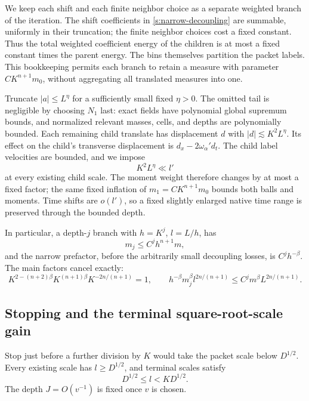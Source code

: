 We keep each shift and each finite neighbor choice as a separate
weighted branch of the iteration.  The shift coefficients in
\eqref{s:narrow-decoupling} are summable, uniformly in their truncation;
the finite neighbor choices cost a fixed constant.  Thus the total
weighted coefficient energy of the children is at most a fixed
constant times the parent energy.  The bins themselves partition the
packet labels.  This bookkeeping permits each branch to retain a
measure with parameter $C K^{n+1}m_0$, without aggregating all
translated measures into one.

Truncate $|a|\le L^\eta$ for a sufficiently small fixed $\eta>0$.
The omitted tail is negligible by choosing $N_1$ last: exact fields
have polynomial global supremum bounds, and normalized relevant
masses, cells, and depths are polynomially bounded.  Each remaining
child translate has displacement $d$ with $|d|\lesssim K^2L^\eta$.
Its effect on the child's transverse displacement is
$d_x-2\omega_\alpha'd_t$.  The child label velocities are bounded, and
we impose
\begin{equation}\label{s:shift-smallness}
 K^2L^\eta\ll l'
\end{equation}
at every existing child scale.  The moment weight therefore changes
by at most a fixed factor; the same fixed inflation of
$m_1=C K^{n+1}m_0$ bounds both balls and moments.  Time shifts are
$o(l')$, so a fixed slightly enlarged native time range is preserved
through the bounded depth.

In particular, a depth-$j$ branch with $h=K^j$, $l=L/h$, has
\begin{equation}\label{s:node-parameter}
 m_j\le C^j h^{n+1}m,
\end{equation}
and the narrow prefactor, before the arbitrarily small decoupling
losses, is $C^jh^{-\beta}$.  The main factors cancel exactly:
\begin{equation}\label{s:cancellation}
 K^{2-(n+2)\beta}K^{(n+1)\beta}K^{-2n/(n+1)}=1,
 \qquad
 h^{-\beta}m_j^\beta l^{2n/(n+1)}
       \le C^j m^\beta L^{2n/(n+1)}.
\end{equation}

\subsection{Stopping and the terminal square-root-scale gain}

Stop just before a further division by $K$ would take the packet scale
below $D^{1/2}$.  Every existing scale has $l\ge D^{1/2}$, and terminal
scales satisfy
\begin{equation}\label{s:terminal-scale}
 D^{1/2}\le l<KD^{1/2}.
\end{equation}
The depth $J=O(v^{-1})$ is fixed once $v$ is chosen.

